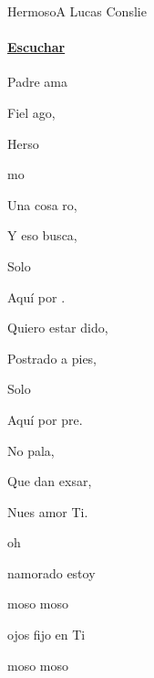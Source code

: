 \documentclass[12pt, spanish]{book}
\begin{document}
    \begin{song}{Hermoso}{A}
    {} %
    {Lucas Conslie}
    {} %
    {}
        \ifChordBk
        \paragraph{\mbox{}\hfill\protect\href{https://open.spotify.com/intl-es/track/1drunkLMQ4ojlkXnQXdrfs}{Escuchar}\mbox{}\hfill}
        \fi

        \begin{SBChorus}
            Padre ama

            Fiel ago,

            Herso

            mo
        \end{SBChorus}

        \begin{SBOpGroup}
            Una cosa ro,

            Y eso busca,

            Solo 

            Aquí por .
        \end{SBOpGroup}

        \begin{SBOpGroup}
            Quiero estar dido,

            Postrado a  pies,

            Solo 

            Aquí por pre.


            No  pala,

            Que dan exsar,

            Nues amor  Ti.

             oh 
        \end{SBOpGroup}

        \begin{SBOpGroup}
            namorado estoy

            moso moso

             ojos fijo en Ti

            moso moso



\end{SBOpGroup}
\end{song}
\end{document}

